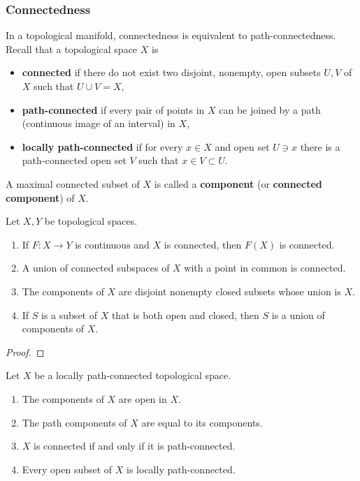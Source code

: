 \subsubsection*{Connectedness}
In a topological manifold, connectedness is equivalent to path-connectedness. 
Recall that a topological space $X$ is 
\begin{itemize}
    \item \textbf{connected} if there do not exist two disjoint, nonempty, open subsets $U,V$ of $X$ such that $U \cup V = X$,
    \item \textbf{path-connected} if every pair of points in $X$ can be joined by a path (continuous image of an interval) in $X$, 
    \item \textbf{locally path-connected} if for every $x \in X$ and open set $U \ni x$ there is a path-connected open set $V$ such that $x \in V \subset U$. 
\end{itemize}
A maximal connected subset of $X$ is called a \textbf{component} (or \textbf{connected component}) of $X$.
\begin{proposition}
    Let $X,Y$ be topological spaces.
    \begin{enumerate}
    \item If $F:X \to Y$ is continuous and $X$ is connected, then $F(X)$ is connected. 
    \item A union of connected subspaces of $X$ with a point in common is connected. 
    \item The components of $X$ are disjoint nonempty closed subsets whose union is $X$. 
    \item If $S$ is a subset of $X$ that is both open and closed, then $S$ is a union of components of $X$. 
    \end{enumerate}
\end{proposition}
\begin{proof}
    
\end{proof}
\begin{proposition}\label{LeeA43}
    Let $X$ be a locally path-connected topological space.
    \begin{enumerate}
    \item The components of $X$ are open in $X$. 
    \item The path components of $X$ are equal to its components. 
    \item $X$ is connected if and only if it is path-connected.
    \item Every open subset of $X$ is locally path-connected. 
    \end{enumerate}
\end{proposition}
